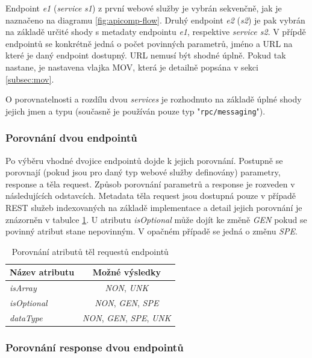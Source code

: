 \documentclass[czech,DP]{thesiskiv}
\begin{document}
Endpoint \textit{e1} (\textit{service} \textit{s1})  z první webové služby je vybrán sekvenčně, jak je naznačeno na diagramu \ref{fig:apicomp-flow}. Druhý endpoint \textit{e2} (\textit{s2}) je pak vybrán na základě určité shody s metadaty endpointu \textit{e1}, respektive \textit{service s2}. V přípdě endpointů se konkrétně jedná o počet povinných parametrů, jméno a URL na které je daný endpoint dostupný. URL nemusí být shodné úplně. Pokud tak nastane, je nastavena vlajka MOV, která je detailně popsána v sekci \ref{subsec:mov}.

O porovnatelnosti a rozdílu dvou \textit{services} je rozhodnuto na základě úplné shody jejich jmen a typu (současně je používán pouze typ "\verb|rpc/messaging|").

\subsubsection{Porovnání dvou endpointů}
Po výběru vhodné dvojice endpointů dojde k jejich porovnání. Postupně se porovnají (pokud jsou pro daný typ webové služby definovány) parametry, response a těla request. Způsob porovnání parametrů a response je rozveden v následujících odstavcích. Metadata těla request jsou dostupná pouze v případě REST služeb indexovaných na základě implementace a detail jejich porovnání je znázorněn v tabulce \ref{tab:req-body-cmp}. U atributu \textit{isOptional} může dojít ke změně \textit{GEN} pokud se povinný atribut stane nepovinným. V opačném případě se jedná o změnu \textit{SPE}.

\begin{table}[h]
	\centering
	\begin{tabular}{|l|c|}
		\hline
		Název atributu  & Možné výsledky \\
		\hline
		\hline
		\textit{isArray} & \textit{NON}, \textit{UNK} \\
		\hline
		\textit{isOptional} & \textit{NON}, \textit{GEN}, \textit{SPE} \\
		\hline
		\textit{dataType} & \textit{NON}, \textit{GEN}, \textit{SPE}, \textit{UNK} \\
		\hline
	\end{tabular}
	\caption{Porovnání atributů těl requestů endpointů}
	\label{tab:req-body-cmp}
\end{table}

\subsubsection{Porovnání response dvou endpointů}
\end{document}
